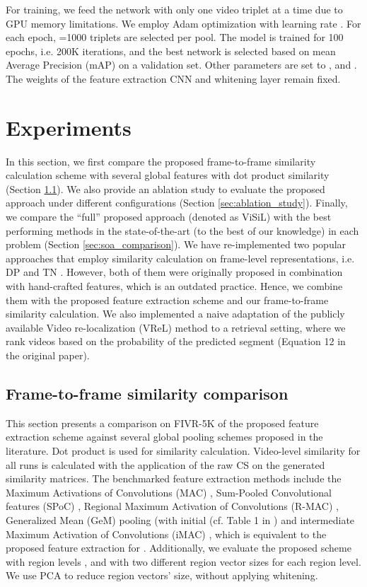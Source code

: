 \documentclass[10pt,twocolumn,letterpaper]{article}
\begin{document}
For training, we feed the network with only one video triplet at a time due to GPU memory limitations. We employ Adam optimization \cite{kingma2014} with learning rate . For each epoch, =1000 triplets are selected per pool. The model is trained for 100 epochs, i.e. 200K iterations, and the best network is selected based on mean Average Precision (mAP) on a validation set. Other parameters are set to ,  and . The weights of the feature extraction CNN and whitening layer remain fixed.

\section{Experiments}
\label{sec:experiments}

In this section, we first compare the proposed frame-to-frame similarity calculation scheme with several global features with dot product similarity (Section \ref{sec:feature_comparison}). We also provide an ablation study to evaluate the proposed approach under different configurations (Section \ref{sec:ablation_study}). Finally, we compare the ``full'' proposed approach (denoted as ViSiL) with the best performing methods in the state-of-the-art (to the best of our knowledge) in each problem (Section \ref{sec:soa_comparison}). 
We have re-implemented two popular approaches that employ similarity calculation on frame-level representations, i.e. DP \cite{chou2015} and TN \cite{tan2009}. However, both of them were originally proposed in combination with hand-crafted features, which is an outdated practice. 
Hence, we combine them with the proposed feature extraction scheme and our frame-to-frame similarity calculation. We also implemented a naive adaptation of the publicly available  Video re-localization (VReL) method \cite{feng2018} to a retrieval setting, where we rank videos based on the probability of the predicted segment (Equation 12 in the original paper).



\subsection{Frame-to-frame similarity comparison}
\label{sec:feature_comparison}
This section presents a comparison  on FIVR-5K of the proposed feature extraction scheme against several global pooling schemes proposed in the literature. Dot product is used for similarity calculation. 
Video-level similarity for all runs is calculated with the application of the raw CS on the generated similarity matrices. The benchmarked feature extraction methods include the Maximum Activations of Convolutions (MAC) \cite{tolias2015},  Sum-Pooled Convolutional features (SPoC) \cite{babenko2015}, Regional Maximum Activation of Convolutions (R-MAC) \cite{tolias2015}, Generalized Mean (GeM) pooling \cite{radenovic2018} (with initial  (cf. Table 1 in \cite{radenovic2018}) and intermediate Maximum Activation of Convolutions (iMAC) \cite{kordopatis2017a}, which is equivalent to the proposed feature extraction for . Additionally, we evaluate the proposed scheme with region levels , and with two different region vector sizes for each region level. We use PCA to reduce region vectors' size, without applying whitening.
\end{document}
